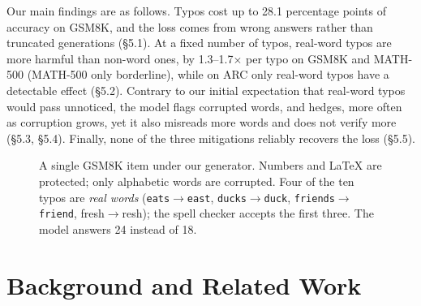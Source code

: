 \documentclass[11pt]{article}
\begin{document}
Our main findings are as follows. Typos cost up to 28.1 percentage points of accuracy on GSM8K, and the loss comes from wrong answers rather than truncated generations (\S5.1). At a fixed number of typos, real-word typos are more harmful than non-word ones, by 1.3--1.7$\times$ per typo on GSM8K and MATH-500 (MATH-500 only borderline), while on ARC only real-word typos have a detectable effect (\S5.2). Contrary to our initial expectation that real-word typos would pass unnoticed, the model flags corrupted words, and hedges, more often as corruption grows, yet it also misreads more words and does not verify more (\S5.3, \S5.4). Finally, none of the three mitigations reliably recovers the loss (\S5.5).
\begin{figure}[t]
\centering
\footnotesize
\setlength{\fboxsep}{4pt}
\caption{A single GSM8K item under our generator. Numbers and LaTeX are protected; only alphabetic words are corrupted. Four of the ten typos are \emph{real words} (\texttt{eats$\rightarrow$east}, \texttt{ducks$\rightarrow$duck}, \texttt{friends$\rightarrow$friend}, fresh$\rightarrow$resh); the spell checker accepts the first three. The model answers 24 instead of 18.}
\label{fig:example}
\end{figure}
\section{Background and Related Work}
\end{document}
